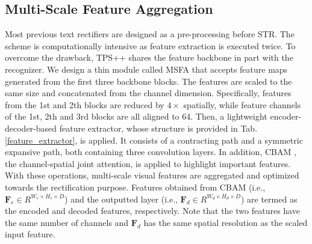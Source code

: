 \documentclass{article}
\begin{document}
\begin{table}[]
\centering
{}
\caption{Structure of the encoder-decoder feature extractor.}
\label{feature_extractor}
\end{table}

\subsection{Multi-Scale Feature Aggregation}
Most previous text rectifiers \cite{shi2016robust_auto_rect,shi2018aster} are designed as a pre-processing before STR. The scheme is computationally intensive as feature extraction is executed twice. To overcome the drawback, TPS++ shares the feature backbone in part with the recognizer. We design a thin module called MSFA that accepts feature maps generated from the first three backbone blocks. The features are scaled to the same size and concatenated from the channel dimension. Specifically, features from the 1st and 2th blocks are reduced by $4\times$ spatially, while feature channels of the 1st, 2th and 3rd blocks are all aligned to 64. Then, a lightweight encoder-decoder-based feature extractor, whose structure is provided in Tab.\ref{feature_extractor}, is applied. It consists of a contracting path and a symmetric expansive path, both containing three convolution layers. In addition, CBAM \cite{woo2018cbam}, the channel-spatial joint attention, is applied to highlight important features. With these operations, multi-scale visual features are aggregated and optimized towards the rectification purpose. Features obtained from CBAM (i.e., $\boldsymbol{F}_{e} \in R^{W_{e}\times H_{e}\times D}$) and the outputted layer (i.e., $\boldsymbol{F}_{d} \in R^{W_{d}\times H_{d}\times D}$) are termed as the encoded and decoded features, respectively. Note that the two features have the same number of channels and $\boldsymbol{F}_{d}$ has the same spatial resolution as the scaled input feature.
\end{document}
